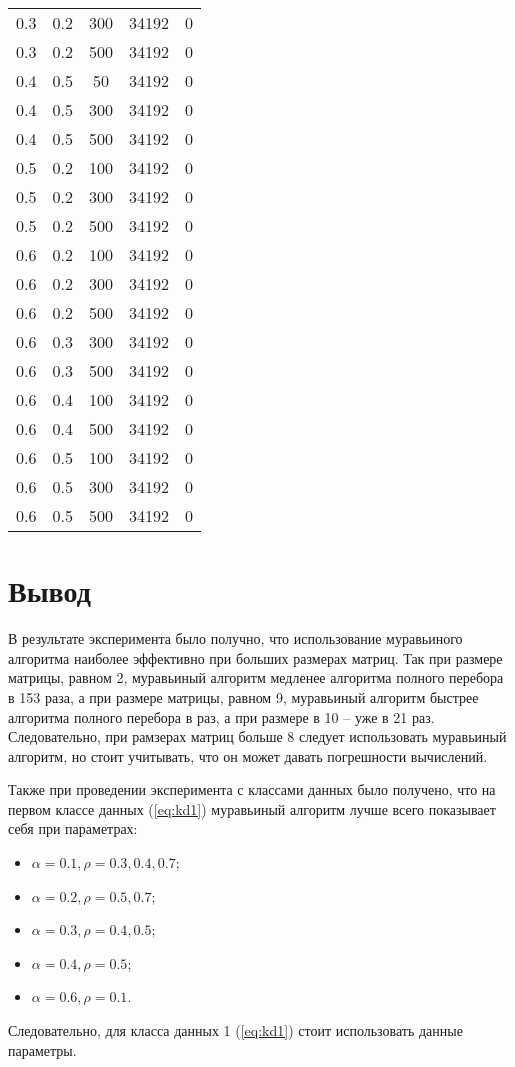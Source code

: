 \begin{center}
\begin{longtable}[c]{|c|c|c|c|c|}
        0.3 &  0.2 &  300 & 34192 &     0 \\
        0.3 &  0.2 &  500 & 34192 &     0 \\ \hline
        0.4 &  0.5 &   50 & 34192 &     0 \\
        0.4 &  0.5 &  300 & 34192 &     0 \\
        0.4 &  0.5 &  500 & 34192 &     0 \\ \hline
        0.5 &  0.2 &  100 & 34192 &     0 \\
        0.5 &  0.2 &  300 & 34192 &     0 \\
        0.5 &  0.2 &  500 & 34192 &     0 \\ \hline
        0.6 &  0.2 &  100 & 34192 &     0 \\
        0.6 &  0.2 &  300 & 34192 &     0 \\
        0.6 &  0.2 &  500 & 34192 &     0 \\ \hline
        0.6 &  0.3 &  300 & 34192 &     0 \\
        0.6 &  0.3 &  500 & 34192 &     0 \\ \hline
        0.6 &  0.4 &  100 & 34192 &     0 \\
        0.6 &  0.4 &  500 & 34192 &     0 \\ \hline
        0.6 &  0.5 &  100 & 34192 &     0 \\
        0.6 &  0.5 &  300 & 34192 &     0 \\
        0.6 &  0.5 &  500 & 34192 &     0 \\ \hline
\end{longtable}
\end{center}

\section{Вывод}

В результате эксперимента было получно, что использование муравьиного алгоритма наиболее эффективно при больших размерах матриц. Так при размере матрицы, равном 2, муравьиный алгоритм медленее алгоритма полного перебора в 153 раза, а при размере матрицы, равном 9, муравьиный алгоритм быстрее алгоритма полного перебора в раз, а при размере в 10 -- уже в 21 раз. Следовательно, при рамзерах матриц больше 8 следует использовать муравьиный алгоритм, но стоит учитывать, что он может давать погрешности вычислений.

Также при проведении эксперимента с классами данных было получено, что на первом классе данных (\ref{eq:kd1}) муравьиный алгоритм лучше всего показывает себя при параметрах:
\begin{itemize}
    \item $\alpha = 0.1, \rho = 0.3, 0.4, 0.7$;
    \item $\alpha = 0.2, \rho = 0.5, 0.7$;
    \item $\alpha = 0.3, \rho = 0.4, 0.5$;
    \item $\alpha = 0.4, \rho = 0.5$;
    \item $\alpha = 0.6, \rho = 0.1$.
\end{itemize}  
Следовательно, для класса данных 1 (\ref{eq:kd1}) стоит использовать данные параметры. 

